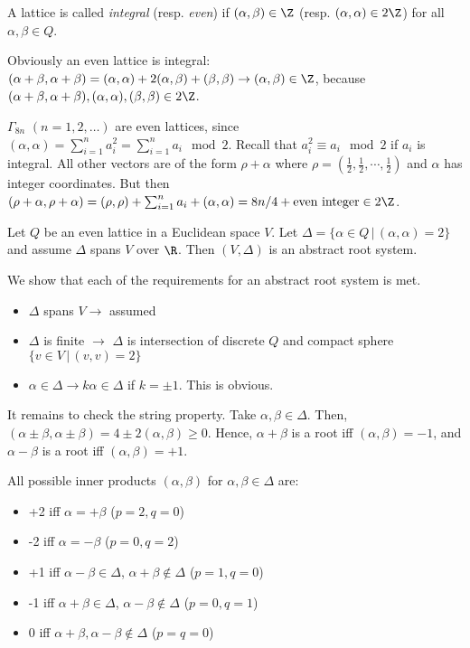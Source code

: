 \documentclass[11pt]{article}
\newenvironment{theorem}[1][Theorem]{\begin{trivlist}
\item[\hskip \labelsep {\bfseries #1}]}{\end{trivlist}}
\newenvironment{proof}[1][Proof]{\begin{trivlist}
\item[\hskip \labelsep {\bfseries #1}]}{\end{trivlist}}
\newenvironment{definition}[1][Definition]{\begin{trivlist}
\item[\hskip \labelsep {\bfseries #1}]}{\end{trivlist}}
\newenvironment{example}[1][Example]{\begin{trivlist}
\item[\hskip \labelsep {\bfseries #1}]}{\end{trivlist}}
\newcommand{\qed}{\nobreak \ifvmode \relax \else
      \ifdim\lastskip<1.5em \hskip-\lastskip
      \hskip1.5em plus0em minus0.5em \fi \nobreak
      \vrule height0.75em width0.5em depth0.25em\fi}
\begin{document}
%
\begin{definition}
A lattice is called \emph{integral} (resp. \emph{even}) if
$(\alpha,\beta)\in \Z$ (resp. $(\alpha,\alpha)\in 2\Z$) for all
$\alpha,\beta \in Q$.
\end{definition}
Obviously an even lattice is integral: $(\alpha + \beta,\alpha +
\beta) = (\alpha,\alpha) + 2(\alpha,\beta)+(\beta,\beta)
\rightarrow (\alpha,\beta) \in \Z$, because $(\alpha +
\beta,\alpha + \beta), (\alpha,\alpha), (\beta,\beta) \in 2\Z$.
%
\begin{example}
$\Gamma_{8n} \,\, (n=1,2,\ldots)$ are even lattices, since
$(\alpha,\alpha) = \sum_{i=1}^{n} a_i^2 = \sum_{i=1}^{n} a_i \mod
2$.  Recall that $a_i^2 \equiv a_i \mod 2$ if $a_i$ is integral.
All other vectors are of the form $\rho + \alpha$ where $\rho =
(\frac{1}{2},\frac{1}{2},\cdots,\frac{1}{2})$ and $\alpha$ has
integer coordinates.  But then $(\rho + \alpha, \rho + \alpha) =
(\rho,\rho)+\sum_{i=1}^n a_i + (\alpha,\alpha) = 8n/4 + \mbox{even
integer} \in 2 \Z$.
\end{example}
%
\begin{theorem}
Let $Q$ be an even lattice in a Euclidean space $V$.  Let
$\Delta=\{ \alpha \in Q \, | \, (\alpha,\alpha)=2 \}$ and assume
$\Delta$ spans $V$ over $\R$.  Then $(V,\Delta)$ is an abstract
root system.
\end{theorem}
%
\begin{proof}
We show that each of the requirements for an abstract root system
is met.
\begin{itemize}
\item $\Delta$ spans $V \rightarrow$ assumed \item $\Delta$ is
finite $\rightarrow$ $\Delta$ is intersection of discrete $Q$ and
compact sphere $\{ v \in V \, | \, (v,v)=2 \}$ \item $\alpha \in
\Delta \rightarrow k \alpha \in \Delta$ if $k=\pm 1$.  This is
obvious.
\end{itemize}
It remains to check the string property.  Take $\alpha,\beta \in
\Delta$.  Then, $(\alpha \pm \beta, \alpha \pm \beta) = 4 \pm
2(\alpha,\beta) \geq 0$.  Hence, $\alpha + \beta$ is a root iff
$(\alpha,\beta) = -1$, and $\alpha - \beta$ is a root iff
$(\alpha,\beta)=+1$.\qed
\end{proof}
%
All possible inner products $(\alpha,\beta)$ for $\alpha,\beta \in
\Delta$ are:
\begin{itemize}
\item +2 iff $\alpha = + \beta$ ($p=2,q=0$) \item -2 iff $\alpha =
- \beta$ ($p=0,q=2$) \item +1 iff $\alpha - \beta \in \Delta$,
$\alpha + \beta \not \in \Delta$ ($p=1,q=0$) \item -1 iff $\alpha
+ \beta \in \Delta$, $\alpha - \beta \not \in \Delta$ ($p=0,q=1$)
\item 0 iff $\alpha + \beta, \alpha - \beta \not \in \Delta$
($p=q=0$)
\end{itemize}
\end{document}
